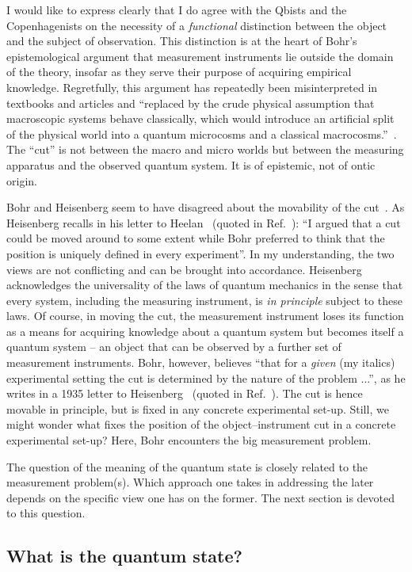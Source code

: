 \documentclass[12pt]{article}
\begin{document}
I would like to express clearly that I do agree with the Qbists and the Copenhagenists on the necessity of a {\it functional} distinction between the object and the subject of observation. This distinction is at the heart of Bohr's epistemological argument that measurement instruments lie outside the domain of the theory, insofar as they serve their purpose of acquiring empirical knowledge. Regretfully, this argument has repeatedly been misinterpreted in textbooks and articles and ``replaced by the crude physical assumption that macroscopic systems behave classically, which would introduce an artificial split of the physical world into a quantum microcosms and a classical macrocosms.''~\cite{osnaghi}. The ``cut'' is not between the macro and micro worlds but between the measuring apparatus and the observed quantum system. It is of epistemic, not of ontic origin. 

Bohr and Heisenberg seem to have disagreed about the movability of the cut~\cite{max}. As Heisenberg recalls in his letter to Heelan~\cite{heelan} (quoted in Ref.~\cite{max}): ``I argued that a cut could be moved around to some extent while Bohr preferred to think that the position is uniquely defined in every experiment''. In my understanding, the two views are not conflicting and can be brought into accordance. Heisenberg acknowledges the universality of the laws of quantum mechanics in the sense that every system, including the measuring instrument, is {\it in principle} subject to these laws. Of course, in moving the cut, the measurement instrument loses its function as a means for acquiring knowledge about a quantum system but becomes itself a quantum system -- an object that can be observed by a further set of measurement instruments. Bohr, however, believes ``that for a {\it given} (my italics) experimental setting the cut is determined by the nature of the problem ...'', as he writes in a 1935 letter to Heisenberg~\cite{AHQP} (quoted in Ref.~\cite{max}). The cut is hence movable in principle, but is fixed in any concrete experimental set-up. Still, we might wonder what fixes the position of the object--instrument cut in a concrete experimental set-up? Here, Bohr encounters the big measurement problem. 

The question of the meaning of the quantum state is closely related to the measurement problem(s). Which approach one takes in addressing the later depends on the specific view one has on the former. The next section is devoted to this question. 

\subsection*{What is the quantum state?}
\end{document}
